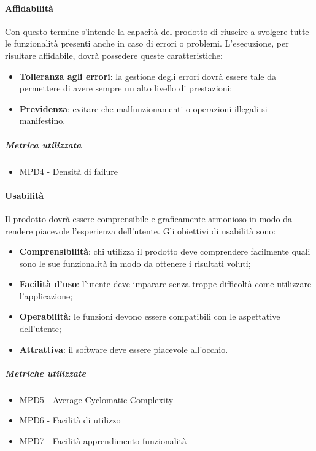 \paragraph{Affidabilità}
Con questo termine s'intende la capacità del prodotto di riuscire a svolgere tutte le funzionalità presenti anche in caso di errori o problemi. L'esecuzione, per risultare affidabile, dovrà possedere queste caratteristiche:
\begin{itemize}
\item \textbf{Tolleranza agli errori}: la gestione degli errori dovrà essere tale da permettere di avere sempre un alto livello di prestazioni;
\item \textbf{Previdenza}: evitare che malfunzionamenti o operazioni illegali si manifestino.
\end{itemize}
\subparagraph{Metrica utilizzata}
\begin{itemize}
\item MPD4 - Densità di failure
\end{itemize}
\paragraph{Usabilità}
Il prodotto dovrà essere comprensibile e graficamente armonioso in modo da rendere piacevole l'esperienza dell'utente. Gli obiettivi di usabilità sono:
\begin{itemize}
\item \textbf{Comprensibilità}: chi utilizza il prodotto deve comprendere facilmente quali sono le sue funzionalità in modo da ottenere i risultati voluti;
\item \textbf{Facilità d'uso}: l'utente deve imparare senza troppe difficoltà come utilizzare l'applicazione;
\item \textbf{Operabilità}: le funzioni devono essere compatibili con le aspettative dell'utente;
\item \textbf{Attrattiva}: il software deve essere piacevole all'occhio.
\end{itemize} 
\subparagraph{Metriche utilizzate}
\begin{itemize}
\item MPD5 - Average Cyclomatic Complexity
\item MPD6 - Facilità di utilizzo
\item MPD7 - Facilità apprendimento funzionalità
\end{itemize}
